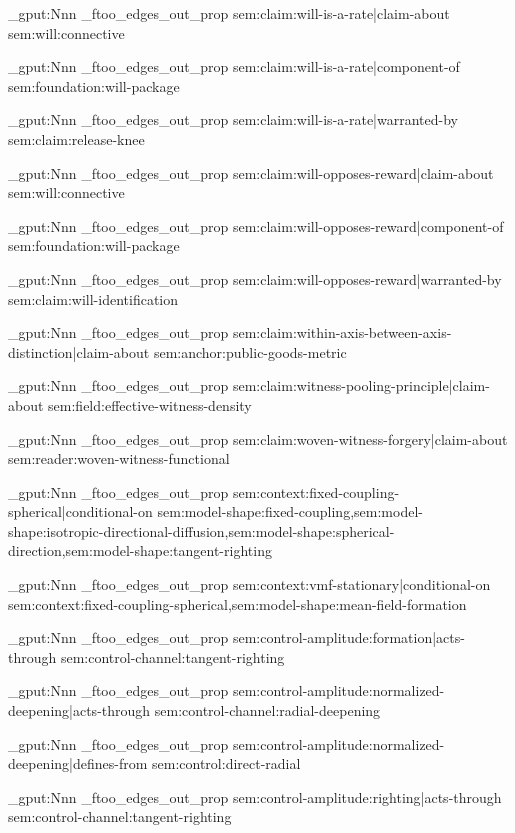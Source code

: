 \prop_gput:Nnn \g_ftoo_edges_out_prop { sem:claim:will-is-a-rate|claim-about } { sem:will:connective }

\prop_gput:Nnn \g_ftoo_edges_out_prop { sem:claim:will-is-a-rate|component-of } { sem:foundation:will-package }

\prop_gput:Nnn \g_ftoo_edges_out_prop { sem:claim:will-is-a-rate|warranted-by } { sem:claim:release-knee }

\prop_gput:Nnn \g_ftoo_edges_out_prop { sem:claim:will-opposes-reward|claim-about } { sem:will:connective }

\prop_gput:Nnn \g_ftoo_edges_out_prop { sem:claim:will-opposes-reward|component-of } { sem:foundation:will-package }

\prop_gput:Nnn \g_ftoo_edges_out_prop { sem:claim:will-opposes-reward|warranted-by } { sem:claim:will-identification }

\prop_gput:Nnn \g_ftoo_edges_out_prop { sem:claim:within-axis-between-axis-distinction|claim-about } { sem:anchor:public-goods-metric }

\prop_gput:Nnn \g_ftoo_edges_out_prop { sem:claim:witness-pooling-principle|claim-about } { sem:field:effective-witness-density }

\prop_gput:Nnn \g_ftoo_edges_out_prop { sem:claim:woven-witness-forgery|claim-about } { sem:reader:woven-witness-functional }

\prop_gput:Nnn \g_ftoo_edges_out_prop { sem:context:fixed-coupling-spherical|conditional-on } { sem:model-shape:fixed-coupling,sem:model-shape:isotropic-directional-diffusion,sem:model-shape:spherical-direction,sem:model-shape:tangent-righting }

\prop_gput:Nnn \g_ftoo_edges_out_prop { sem:context:vmf-stationary|conditional-on } { sem:context:fixed-coupling-spherical,sem:model-shape:mean-field-formation }

\prop_gput:Nnn \g_ftoo_edges_out_prop { sem:control-amplitude:formation|acts-through } { sem:control-channel:tangent-righting }

\prop_gput:Nnn \g_ftoo_edges_out_prop { sem:control-amplitude:normalized-deepening|acts-through } { sem:control-channel:radial-deepening }

\prop_gput:Nnn \g_ftoo_edges_out_prop { sem:control-amplitude:normalized-deepening|defines-from } { sem:control:direct-radial }

\prop_gput:Nnn \g_ftoo_edges_out_prop { sem:control-amplitude:righting|acts-through } { sem:control-channel:tangent-righting }

